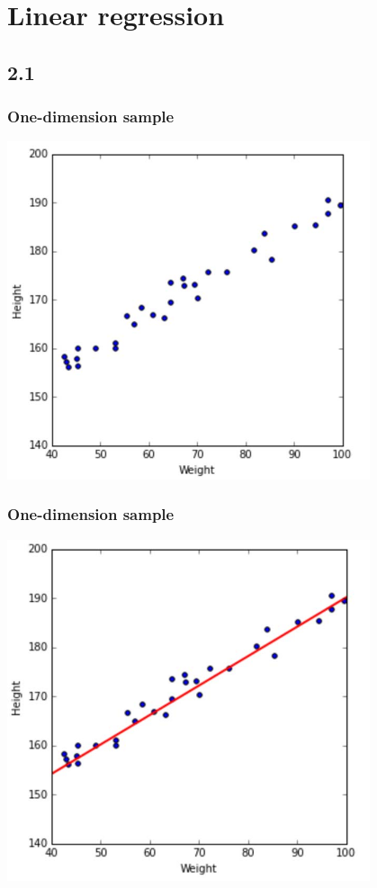 \documentclass[default]{beamer}
\begin{document}
	\section{Linear regression}
	\subsection{2.1}
	
	\begin{frame}
		\frametitle{One-dimension sample}
		
		\centering
		\includegraphics[width=0.8\textwidth]{linear_9.jpg}
	\end{frame}

	\begin{frame}
		\frametitle{One-dimension sample}
		
		\centering
		\includegraphics[width=0.8\textwidth]{linear_10.jpg}
	\end{frame}
	
\end{document}

